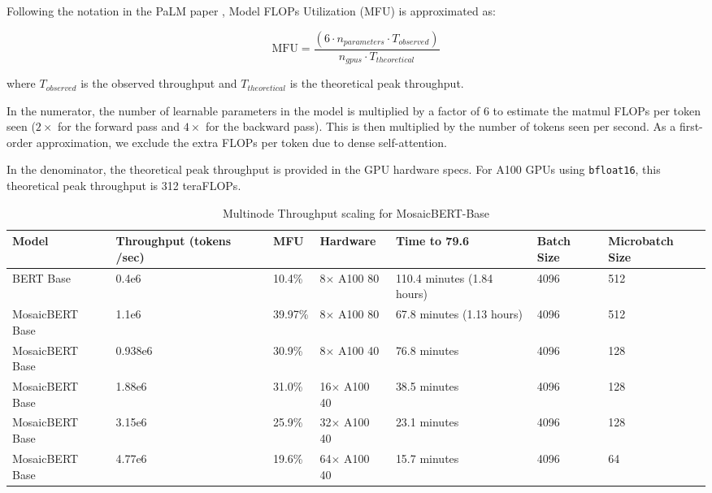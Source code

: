 Following the notation in the PaLM paper \citep{chowdhery2022palm}, Model FLOPs Utilization (MFU) is approximated as:

\begin{equation}
    \textrm{MFU} = \frac{(6 \cdot n_{parameters} \cdot T_{observed})}{n_{gpus} \cdot T_{theoretical}}
\end{equation}

where $T_{observed}$ is the observed throughput and $T_{theoretical}$ is the theoretical peak throughput.

In the numerator, the number of learnable parameters in the model is multiplied by a factor of 6 to estimate the matmul FLOPs per token seen ($2\times$ for the forward pass and $4\times$ for the backward pass). This is then multiplied by the number of tokens seen per second. As a first-order approximation, we exclude the extra FLOPs per token due to dense self-attention.

In the denominator, the theoretical peak throughput is provided in the GPU hardware specs. For A100 GPUs using \texttt{bfloat16}, this theoretical peak throughput is 312 teraFLOPs.




\begin{table}[]
\begin{tabular}{p{2.3cm} p{1.8cm} p{1.0cm} p{1.2cm} p{} p{} p{1.7cm}}
\toprule
Model & Throughput (tokens /sec) & MFU & Hardware & Time to 79.6 & Batch Size & Microbatch Size \\ \midrule
BERT Base & 0.4e6 & 10.4\% & 8$\times$ A100 80 & 110.4 minutes (1.84 hours) & 4096 & 512 \\
MosaicBERT Base & 1.1e6 & 39.97\% & 8$\times$ A100 80 & 67.8 minutes (1.13 hours) & 4096 & 512 \\
MosaicBERT Base & 0.938e6 & 30.9\% & 8$\times$ A100 40 & 76.8 minutes & 4096 & 128 \\
MosaicBERT Base & 1.88e6 & 31.0\% & 16$\times$ A100 40 & 38.5 minutes & 4096 & 128 \\
MosaicBERT Base & 3.15e6 & 25.9\% & 32$\times$ A100 40 & 23.1 minutes & 4096 & 128 \\
MosaicBERT Base & 4.77e6 & 19.6\% & 64$\times$ A100 40 & 15.7 minutes & 4096 & 64 \\
\bottomrule
\end{tabular}
\caption{Multinode Throughput scaling for MosaicBERT-Base}
\end{table}



















